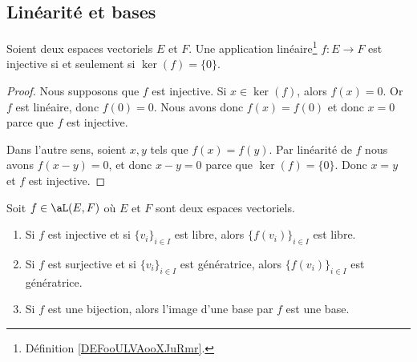 \subsection{Linéarité et bases}

\begin{proposition}
	Soient deux espaces vectoriels \( E\) et \( F\). Une application linéaire\footnote{Définition \ref{DEFooULVAooXJuRmr}.} \( f\colon E\to F\) est injective si et seulement si \( \ker(f)=\{ 0 \}\).
\end{proposition}

\begin{proof}
	Nous supposons que \( f\) est injective. Si \( x\in\ker(f)\), alors \( f(x)=0\). Or \( f\) est linéaire, donc \( f(0)=0\). Nous avons donc \( f(x)=f(0)\) et donc \( x=0\) parce que \( f\) est injective.

	Dans l'autre sens, soient \( x,y\) tels que \( f(x)=f(y)\). Par linéarité de \( f\) nous avons \( f(x-y)=0\), et donc \( x-y=0\) parce que \( \ker(f)=\{0\}\). Donc \( x=y\) et \( f\) est injective.
\end{proof}

\begin{proposition}      \label{PROPooZFKZooBGLSex}
	Soit \( f\in \aL(E,F)\) où \( E\) et \( F\) sont deux espaces vectoriels.
	\begin{enumerate}
		\item   \label{ITEMooPPMEooIaZqtm}
		      Si \( f\) est injective et si \( \{v_i\}_{i\in I}\) est libre, alors \( \{f(v_i)\}_{i\in I}\) est libre.
		\item   \label{ITEMooOZSPooQBrDGi}
		      Si \( f\) est surjective et si \( \{v_i\}_{i\in I}\) est génératrice, alors \( \{f(v_i)\}_{i\in I}\) est génératrice.
		\item   \label{ITEMooOIEYooIfdFnv}
		      Si \( f\) est une bijection, alors l'image d'une base par \( f\) est une base.
	\end{enumerate}
\end{proposition}

